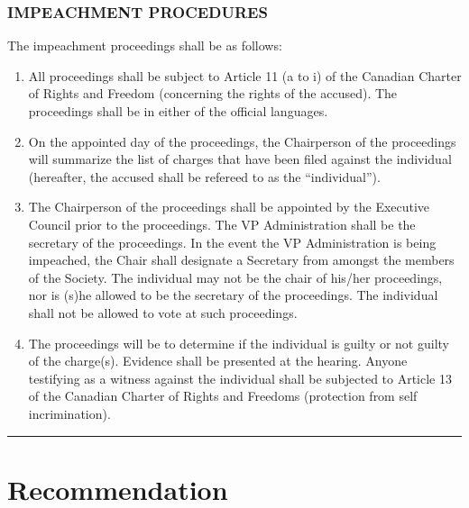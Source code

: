 \section{IMPEACHMENT PROCEDURES}\label{impeachment-procedures}

The impeachment proceedings shall be as follows:

\begin{enumerate}
\def\labelenumi{\alph{enumi})}
\item
  All proceedings shall be subject to Article 11 (a to i) of the
  Canadian Charter of Rights and Freedom (concerning the rights of the
  accused). The proceedings shall be in either of the official
  languages.
\item
  On the appointed day of the proceedings, the Chairperson of the
  proceedings will summarize the list of charges that have been filed
  against the individual (hereafter, the accused shall be refereed to as
  the ``individual'').
\item
  The Chairperson of the proceedings shall be appointed by the Executive
  Council prior to the proceedings. The VP Administration shall be the
  secretary of the proceedings. In the event the VP Administration is
  being impeached, the Chair shall designate a Secretary from amongst
  the members of the Society. The individual may not be the chair of
  his/her proceedings, nor is (s)he allowed to be the secretary of the
  proceedings. The individual shall not be allowed to vote at such
  proceedings.
\item
  The proceedings will be to determine if the individual is guilty or
  not guilty of the charge(s). Evidence shall be presented at the
  hearing. Anyone testifying as a witness against the individual shall
  be subjected to Article 13 of the Canadian Charter of Rights and
  Freedoms (protection from self incrimination).
\end{enumerate}

\begin{center}\rule{0.5\linewidth}{\linethickness}\end{center}

\part{Recommendation}\label{recommendation}


